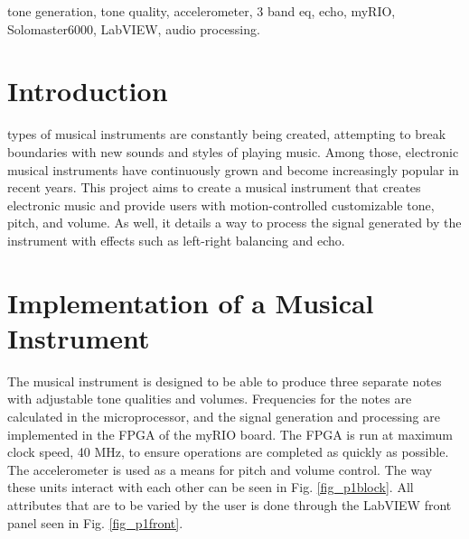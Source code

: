 \begin{IEEEkeywords}
tone generation, tone quality, accelerometer, 3 band eq, echo, myRIO, Solomaster6000, LabVIEW, audio processing. 
\end{IEEEkeywords}

\IEEEpeerreviewmaketitle



\section{Introduction}
%
%
%
%
 types of musical instruments are constantly being created, attempting to break boundaries with new sounds and styles of playing music.
Among those, electronic musical instruments  have continuously grown and become increasingly popular in recent years.
This project aims to create a musical instrument that creates electronic music and provide users with motion-controlled customizable tone, pitch, and volume.
As well, it details a way to process the signal generated by the instrument with effects such as left-right balancing and echo.

\section{Implementation of a Musical Instrument}
The musical instrument is designed to be able to produce three separate notes with adjustable tone qualities and volumes.
 Frequencies for the notes are calculated in the microprocessor, and the signal generation and processing are implemented in the FPGA of the myRIO board.
 The FPGA is run at maximum clock speed, 40 MHz, to ensure operations are completed as quickly as possible.
 The accelerometer is used as a means for pitch and volume control.
 The way these units interact with each other can be seen in Fig. \ref{fig_p1block}.
 All attributes that are to be varied by the user is done through the LabVIEW front panel seen in Fig. \ref{fig_p1front}.


